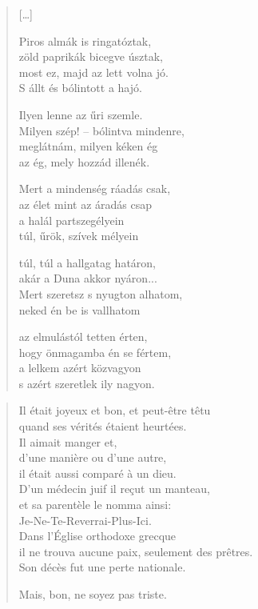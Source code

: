 \documentclass[11pt]{extbook}
\newcommand*{\centeredornament}{\centerline{\pgfornament[width=6cm]{88}}}
\begin{document}
\begin{verse}
  \textnormal{[\ldots]}

  Piros almák is ringatóztak, \\
  zöld paprikák bicegve úsztak, \\
  most ez, majd az lett volna jó. \\
  S állt és bólintott a hajó.

  Ilyen lenne az űri szemle. \\
  Milyen szép! -- bólintva mindenre, \\
  meglátnám, milyen kéken ég \\
  az ég, mely hozzád illenék.

  Mert a mindenség ráadás csak, \\
  az élet mint az áradás csap \\
  a halál partszegélyein \\
  túl, űrök, szívek mélyein

  túl, túl a hallgatag határon, \\
  akár a Duna akkor nyáron... \\
  Mert szeretsz s nyugton alhatom, \\
  neked én be is vallhatom

  az elmulástól tetten érten, \\
  hogy önmagamba én se fértem, \\
  a lelkem azért közvagyon \\
  s azért szeretlek ily nagyon.
\end{verse}

\newpage


\vspace*{-15mm}
\centeredornament



\begin{verse}
  Il était joyeux et bon, et peut-être têtu \\
  quand ses vérités étaient heurtées. \\
  Il aimait manger et, \\
  d'une manière ou d'une autre, \\
  il était aussi comparé à un dieu. \\
  D'un médecin juif il reçut un manteau, \\
  et sa parentèle le nomma ainsi: \\
  Je-Ne-Te-Reverrai-Plus-Ici. \\
  Dans l'Église orthodoxe grecque \\
  il ne trouva aucune paix, seulement des prêtres.\hspace*{-1mm} \\
  Son décès fut une perte nationale.

  Mais, bon, ne soyez pas triste.
\end{verse}
\end{document}
